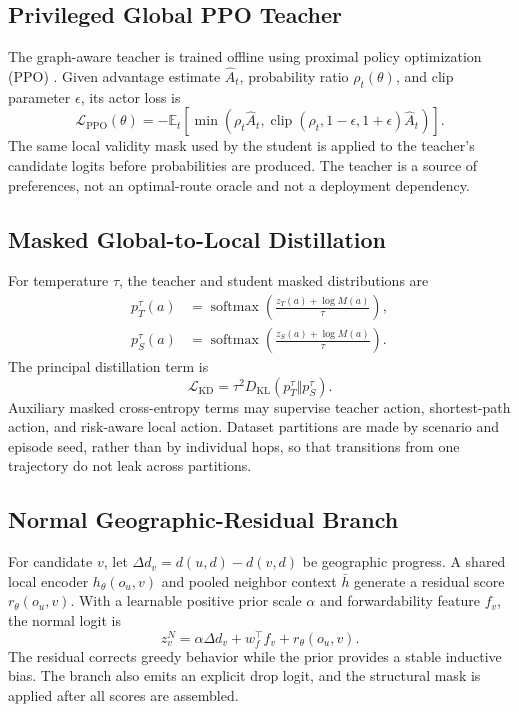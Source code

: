 \documentclass{ieeeaccess}
\newcommand{\E}{\mathbb{E}}
\begin{document}
\subsection{Privileged Global PPO Teacher}

The graph-aware teacher is trained offline using proximal policy optimization (PPO) \cite{schulman2017ppo}. Given advantage estimate $\hat A_t$, probability ratio $\rho_t(\theta)$, and clip parameter $\epsilon$, its actor loss is
\begin{equation}
\mathcal{L}_{\mathrm{PPO}}(\theta)=-\E_t\!\left[\min\left(\rho_t\hat A_t,\operatorname{clip}(\rho_t,1-\epsilon,1+\epsilon)\hat A_t\right)\right].
\end{equation}
The same local validity mask used by the student is applied to the teacher's candidate logits before probabilities are produced. The teacher is a source of preferences, not an optimal-route oracle and not a deployment dependency.

\subsection{Masked Global-to-Local Distillation}

For temperature $\tau$, the teacher and student masked distributions are
\begin{equation}
\begin{aligned}
p_T^\tau(a)&=\operatorname{softmax}\!\left(\frac{z_T(a)+\log M(a)}{\tau}\right),\\
p_S^\tau(a)&=\operatorname{softmax}\!\left(\frac{z_S(a)+\log M(a)}{\tau}\right).
\end{aligned}
\end{equation}
The principal distillation term is \cite{hinton2015distilling}
\begin{equation}
\mathcal{L}_{\mathrm{KD}}=\tau^2D_{\mathrm{KL}}(p_T^\tau\Vert p_S^\tau).
\end{equation}
Auxiliary masked cross-entropy terms may supervise teacher action, shortest-path action, and risk-aware local action. Dataset partitions are made by scenario and episode seed, rather than by individual hops, so that transitions from one trajectory do not leak across partitions.

\subsection{Normal Geographic-Residual Branch}

For candidate $v$, let $\Delta d_v=d(u,d)-d(v,d)$ be geographic progress. A shared local encoder $h_\theta(o_u,v)$ and pooled neighbor context $\bar h$ generate a residual score $r_\theta(o_u,v)$. With a learnable positive prior scale $\alpha$ and forwardability feature $f_v$, the normal logit is
\begin{equation}
z^N_v=\alpha\Delta d_v+w_f^\top f_v+r_\theta(o_u,v).
\end{equation}
The residual corrects greedy behavior while the prior provides a stable inductive bias. The branch also emits an explicit drop logit, and the structural mask is applied after all scores are assembled.
\end{document}
